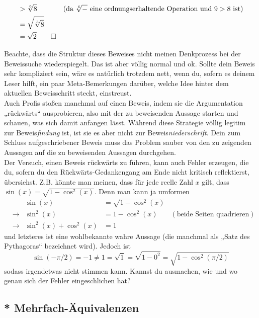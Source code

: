 \begin{bem}
\begin{bew}
\begin{align*}
& > \sqrt[6]{8} & (\text{da $\sqrt[6]{-}$ eine ordnungserhaltende Operation und $9>8$ ist}) \\
& = \sqrt{\sqrt[3]{8}} \\
& = \sqrt{2} \qed
 \end{align*}
 \end{bew}
Beachte, dass die Struktur dieses Beweises nicht meinen Denkprozess bei der Beweissuche wiederspiegelt. Das ist aber völlig normal und ok. Sollte dein Beweis sehr kompliziert sein, wäre es natürlich trotzdem nett, wenn du, sofern es deinem Leser hilft, ein paar Meta-Bemerkungen darüber, welche Idee hinter dem aktuellen Beweisschritt steckt, einstreust. \\
Auch Profis stoßen manchmal auf einen Beweis, indem sie die Argumentation „rückwärts“ ausprobieren, also mit der zu beweisenden Aussage starten und schauen, was sich damit anfangen lässt. Während diese Strategie völlig legitim zur Beweis\emph{findung} ist, ist sie es aber nicht zur Beweis\emph{niederschrift}. Dein zum Schluss aufgeschriebener Beweis muss das Problem sauber von den zu zeigenden Aussagen auf die zu beweisenden Aussagen durchgehen. \\
Der Versuch, einen Beweis rückwärts zu führen, kann auch Fehler erzeugen, die du, sofern du den Rückwärts-Gedankengang am Ende nicht kritisch reflektierst, übersiehst. Z.B. könnte man meinen, dass für jede reelle Zahl $x$ gilt, dass $\sin(x)=\sqrt{1-\cos^2(x)}$. Denn man kann ja umformen
\begin{align*}
 &&\sin(x)& =\sqrt{1-\cos^2(x)} \\
 & \to & \sin^2(x)& = 1-\cos^2(x) & (\text{beide Seiten quadrieren}) \\
 & \to & \sin^2(x) + \cos^2(x) &= 1
\end{align*}
und letzteres ist eine wohlbekannte wahre Aussage (die manchmal als „Satz des Pythagoras“ bezeichnet wird). Jedoch ist
\[ \sin(-\pi/2) = -1 \neq 1 = \sqrt{1}= \sqrt{1-0^2} = \sqrt{1-\cos^2(\pi/2)} \]
sodass irgendetwas nicht stimmen kann. Kannst du ausmachen, wie und wo genau sich der Fehler eingeschlichen hat?
\end{bem}



\subsection{* Mehrfach-Äquivalenzen}

